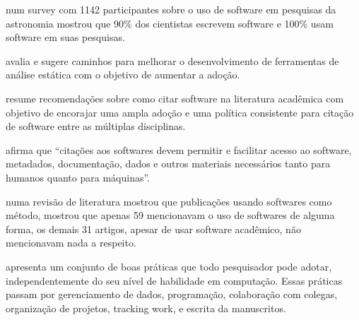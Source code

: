 num survey com 1142 participantes sobre o uso de software em pesquisas da
astronomia mostrou que 90\% dos cientistas escrevem software e 100\% usam
software em suas pesquisas.

 avalia e sugere caminhos para melhorar o
desenvolvimento de ferramentas de análise estática com o objetivo de aumentar a
adoção.

 resume recomendações sobre como citar software
na literatura acadêmica com objetivo de encorajar uma ampla adoção e uma
política consistente para citação de software entre as múltiplas disciplinas.

 afirma que ``citações aos softwares devem
permitir e facilitar acesso ao software, metadados, documentação, dados e
outros materiais necessários tanto para humanos quanto para máquinas''.


numa revisão de literatura mostrou que publicações usando softwares como
método, mostrou que apenas 59 mencionavam o uso de softwares de alguma forma,
os demais 31 artigos, apesar de usar software acadêmico, não mencionavam nada a
respeito.

 apresenta um conjunto de boas práticas que todo
pesquisador pode adotar, independentemente do seu nível de habilidade em
computação. Essas práticas passam por gerenciamento de dados, programação,
colaboração com colegas, organização de projetos, tracking work, e escrita da
manuscritos.



